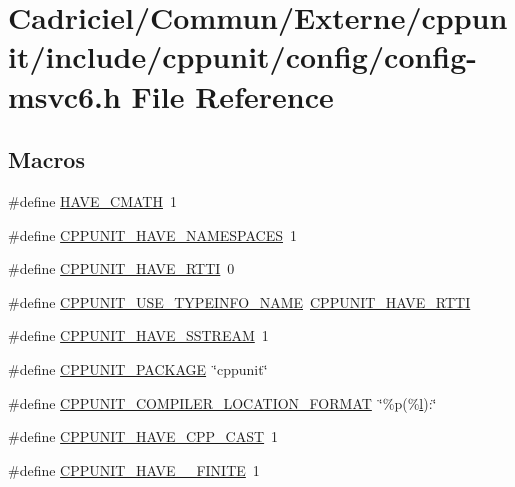 \hypertarget{config-msvc6_8h}{\section{Cadriciel/\-Commun/\-Externe/cppunit/include/cppunit/config/config-\/msvc6.h File Reference}
\label{config-msvc6_8h}
}
\subsection*{Macros}
\begin{DoxyCompactItemize}
\item 
\#define \hyperlink{config-msvc6_8h_a5ebdfdabf36598943dc9faa5699a1ba5}{H\-A\-V\-E\-\_\-\-C\-M\-A\-T\-H}~1
\item 
\#define \hyperlink{config-msvc6_8h_a3ab513bf42c44fb8ea41bd9e91249975}{C\-P\-P\-U\-N\-I\-T\-\_\-\-H\-A\-V\-E\-\_\-\-N\-A\-M\-E\-S\-P\-A\-C\-E\-S}~1
\item 
\#define \hyperlink{config-msvc6_8h_aa57c801a8aa25a44f91b88435ebdfc99}{C\-P\-P\-U\-N\-I\-T\-\_\-\-H\-A\-V\-E\-\_\-\-R\-T\-T\-I}~0
\item 
\#define \hyperlink{config-msvc6_8h_a40c5e2a5f158770c99264e4a3e76c7c7}{C\-P\-P\-U\-N\-I\-T\-\_\-\-U\-S\-E\-\_\-\-T\-Y\-P\-E\-I\-N\-F\-O\-\_\-\-N\-A\-M\-E}~\hyperlink{config-msvc6_8h_aa57c801a8aa25a44f91b88435ebdfc99}{C\-P\-P\-U\-N\-I\-T\-\_\-\-H\-A\-V\-E\-\_\-\-R\-T\-T\-I}
\item 
\#define \hyperlink{config-msvc6_8h_abfac7981ab6ff3283d18d6f843060012}{C\-P\-P\-U\-N\-I\-T\-\_\-\-H\-A\-V\-E\-\_\-\-S\-S\-T\-R\-E\-A\-M}~1
\item 
\#define \hyperlink{config-msvc6_8h_ab061dbee09290b54646174466eff2e73}{C\-P\-P\-U\-N\-I\-T\-\_\-\-P\-A\-C\-K\-A\-G\-E}~\char`\"{}cppunit\char`\"{}
\item 
\#define \hyperlink{config-msvc6_8h_a17c58ff0a5526dbcd28ebe3af5e7f04d}{C\-P\-P\-U\-N\-I\-T\-\_\-\-C\-O\-M\-P\-I\-L\-E\-R\-\_\-\-L\-O\-C\-A\-T\-I\-O\-N\-\_\-\-F\-O\-R\-M\-A\-T}~\char`\"{}\%p(\%\hyperlink{glew_8h_ad0c4520fe2189faca59157f84ef690f9}{l})\-:\char`\"{}
\item 
\#define \hyperlink{config-msvc6_8h_a86f47584dc359a7d7ae86a50357ef6bf}{C\-P\-P\-U\-N\-I\-T\-\_\-\-H\-A\-V\-E\-\_\-\-C\-P\-P\-\_\-\-C\-A\-S\-T}~1
\item 
\#define \hyperlink{config-msvc6_8h_ae452bc2f11857a9c8a6b713f4f5fee3e}{C\-P\-P\-U\-N\-I\-T\-\_\-\-H\-A\-V\-E\-\_\-\-\_\-\-F\-I\-N\-I\-T\-E}~1
\end{DoxyCompactItemize}


